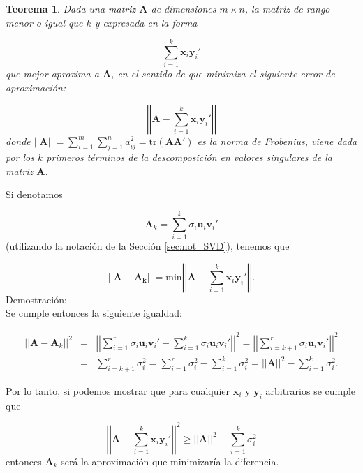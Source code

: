 \documentclass[tfg,cienciasbased,lot,lof,covers,final,overleaf,nocopyright]{tfgtfmthesisuam}
\newcommand{\normleft}{\left|\left|}
\newcommand{\normright}{\right|\right|}
\newtheorem{teor}{Teorema}[chapter]
\begin{document}
\begin{teor}
    Dada una matriz $\mathbf{A}$ de dimensiones $m \times n$, la matriz de rango menor o igual que $k$ y expresada en la forma
    
    \begin{equation*}
        \sum_{i=1}^{k} \mathbf{x}_i \mathbf{y}_i'
    \end{equation*}
    que mejor aproxima a $\mathbf{A}$, en el sentido de que minimiza el siguiente error de aproximación:
    
    \begin{equation*}
        \normleft \mathbf{A} -  \sum_{i=1}^{k} \mathbf{x}_i \mathbf{y}_i' \normright
    \end{equation*}
    donde $\normleft \mathbf{A} \normright = \sum_{i=1}^m \sum_{j=1}^n a_{ij}^2 = \mbox{tr}(\mathbf{AA'})$ es la norma de Frobenius, viene dada por los $k$ primeros términos de la descomposición en valores singulares de la matriz $\mathbf{A}$.
\end{teor}
Si denotamos 

\begin{equation*}
    \mathbf{A}_k = \sum_{i=1}^{k} \sigma_i \mathbf{u}_i \mathbf{v}_i'
\end{equation*}
(utilizando la notación de la Sección \ref{sec:not_SVD}), tenemos que

\begin{equation*}
    \normleft \mathbf{A} - \mathbf{A_k} \normright = \mbox{min} \normleft \mathbf{A} - \sum_{i=1}^k \mathbf{x}_i \mathbf{y}_i' \normright .
\end{equation*}
Demostración:\\
Se cumple entonces la siguiente igualdad:

\begin{eqnarray*}
    \normleft \mathbf{A} - \mathbf{A}_k \normright^2 & = &
    \normleft \sum_{i=1}^{r} \sigma_i \mathbf{u}_i \mathbf{v}_i' -  \sum_{i=1}^{k} \sigma_i \mathbf{u}_i \mathbf{v}_i' \normright^2
     =  \normleft \sum_{i=k+1}^{r} \sigma_i \mathbf{u}_i \mathbf{v}_i' \normright^2 \\
    & = & \sum_{i=k+1}^{r} \sigma_i^2
    =  \sum_{i=1}^{r} \sigma_i^2 - \sum_{i=1}^{k} \sigma_i^2 
    =  \normleft \mathbf{A} \normright^2 - \sum_{i=1}^{k} \sigma_i^2.
\end{eqnarray*}

Por lo tanto, si podemos mostrar que para cualquier $\mathbf{x}_i$ y $\mathbf{y}_i$ arbitrarios se cumple que

\begin{equation*}
    \normleft \mathbf{A} -  \sum_{i=1}^{k} \mathbf{x}_i \mathbf{y}_i' \normright^2 \geq \normleft \mathbf{A} \normright^2 - \sum_{i=1}^{k} \sigma_i^2
\end{equation*}
entonces $\mathbf{A}_k$ será la aproximación que minimizaría la diferencia.
\end{document}
